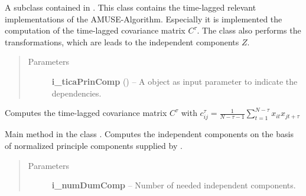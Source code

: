 \documentclass[letterpaper,10pt,english]{sphinxmanual}
\begin{document}
\begin{fulllineitems}
\begin{fulllineitems}
\label{tica:Tica_PrincipleComp.TicaPrinComp.TicaPrinCompTimeLagged}
A subclass contained in {\hyperref[tica:Tica_PrincipleComp.TicaPrinComp]{}}. This class contains the time-lagged relevant implementations
of the AMUSE-Algorithm. Especially it is implemented the computation of the
time-lagged covariance matrix \(C^{\tau}\).
The class {\hyperref[tica:Tica_PrincipleComp.TicaPrinComp.TicaPrinCompTimeLagged]{}} also performs the transformations, which are leads to the
independent components \(Z\).
\begin{quote}\begin{description}
\item[{Parameters}] \leavevmode
\textbf{i\_ticaPrinComp} ({\hyperref[tica:Tica_PrincipleComp.TicaPrinComp]{}}) -- A {\hyperref[tica:Tica_PrincipleComp.TicaPrinComp]{}} object as input parameter to indicate the dependencies.

\end{description}\end{quote}

\begin{fulllineitems}
\label{tica:Tica_PrincipleComp.TicaPrinComp.TicaPrinCompTimeLagged.computeCovariance}
Computes the time-lagged covariance matrix \(C^{\tau}\) with
\(c_{ij}^{\tau} = \frac{1}{N-\tau-1}\sum_{t=1}^{N-\tau}x_{it}x_{jt+\tau}\)

\end{fulllineitems}


\begin{fulllineitems}
\label{tica:Tica_PrincipleComp.TicaPrinComp.TicaPrinCompTimeLagged.computeICs}
Main method in the class {\hyperref[tica:Tica_PrincipleComp.TicaPrinComp.TicaPrinCompTimeLagged]{}}.
Computes the independent components on the basis of normalized principle components supplied by
{\hyperref[tica:Tica_PrincipleComp.TicaPrinComp]{}}.
\begin{quote}\begin{description}
\item[{Parameters}] \leavevmode
\textbf{i\_numDumComp} -- Number of needed independent components.


\end{description}
\end{quote}
\end{fulllineitems}
\end{fulllineitems}
\end{fulllineitems}
\end{document}
